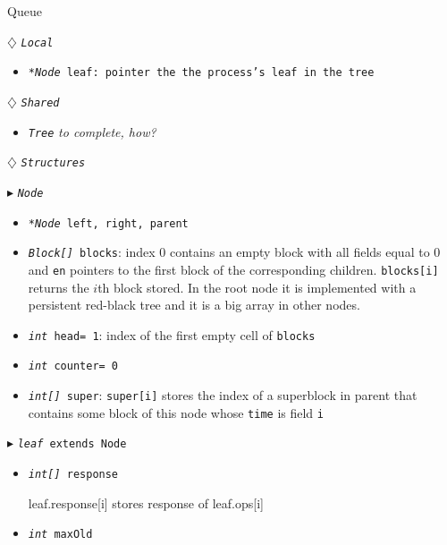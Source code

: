 \documentclass[10pt]{article}
\theoremstyle{definition}
\begin{document}
\begin{algorithm}
\caption{Queue \label{algQ}}
\begin{algorithmic}[1]
\begin{multicols}{2}


\Statex $\diamondsuit$ \texttt{\textsl{Local}}
\begin{itemize}
\item \texttt{\textsl{*Node} leaf\textsf{: pointer the the process's leaf in the tree}}
\end{itemize}

\Statex

\Statex $\diamondsuit$ \texttt{\textsl{Shared}}
\begin{itemize}
\item \texttt{\textsl{Tree}} \textit{to complete, how?}
\end{itemize}

\Statex
\Statex $\diamondsuit$ \texttt{\textsl{Structures}}

\Statex $\blacktriangleright$ \texttt{\textsl{Node}}
\begin{itemize}
\item \texttt{\textsl{*Node} left, right, parent}
\item \texttt{\textsl{Block[]} blocks}\textsf{: index 0 contains an empty block with all fields equal to 0 and \texttt{en} pointers to the first block of the corresponding children. \texttt{blocks[i]} returns the $i$th block stored.  In the root node it is implemented with a persistent red-black tree and it is a big array in other nodes.}
\item \texttt{\textsl{int} head= 1}\textsf{: index of the first empty cell of \texttt{blocks}}
\item \texttt{\textsl{int} counter= 0}\textsf{}
\item \texttt{\textsl{int[]} super}\textsf{: \texttt{super[i]} stores the index of a superblock in parent that contains some block of this node whose \texttt{time} is field \texttt{i}}
\end{itemize}

\Statex $\blacktriangleright$ \texttt{\textsl{leaf} extends Node}
\begin{itemize}
  \item \texttt{\textsl{int[]} response}
  
  \textsf{leaf.response[i] stores response of leaf.ops[i]}
  
  \item \texttt{\textsl{int} maxOld}


\end{itemize}
\end{multicols}
\end{algorithmic}
\end{algorithm}
\end{document}
